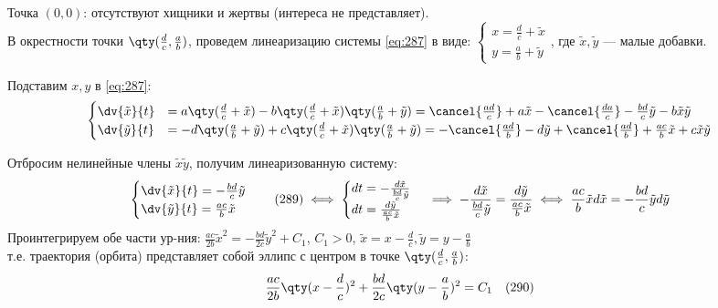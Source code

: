 Точка $(0,0)$: отсутствуют хищники и жертвы (интереса не представляет). \\
В окрестности точки $\qty(\frac{d}{c}, \frac{a}{b})$, проведем линеаризацию системы \eqref{eq:287} в виде:
$\begin{cases} x = \frac{d}{c} + \tilde{x} \\ y = \frac{a}{b} + \tilde{y} \end{cases}$, где $\tilde{x}, \tilde{y}$ — малые добавки.

Подставим $x,y$ в \eqref{eq:287}:
\begin{align*}
	\begin{cases}
		\dv{\tilde{x}}{t} &= a\qty(\frac{d}{c} + \tilde{x}) - b\qty(\frac{d}{c} + \tilde{x})\qty(\frac{a}{b} + \tilde{y}) = \cancel{\frac{ad}{c}} + a\tilde{x} - \cancel{\frac{da}{c}} - \frac{bd}{c}\tilde{y} - b\tilde{x}\tilde{y} \\
		\dv{\tilde{y}}{t} &= -d\qty(\frac{a}{b} + \tilde{y}) + c\qty(\frac{d}{c} + \tilde{x})\qty(\frac{a}{b} + \tilde{y}) = -\cancel{\frac{ad}{b}} - d\tilde{y} + \cancel{\frac{ad}{b}} + \frac{ac}{b}\tilde{x} + c\tilde{x}\tilde{y}
	\end{cases}
\end{align*}

Отбросим нелинейные члены $\tilde{x}\tilde{y}$, получим линеаризованную систему:
\begin{equation} \label{eq:289}
	\begin{cases}
		\dv{\tilde{x}}{t} = -\frac{bd}{c}\tilde{y} \\
		\dv{\tilde{y}}{t} = \frac{ac}{b}\tilde{x}
	\end{cases} \quad (289) \iff
	\begin{cases}
		dt = -\frac{d\tilde{x}}{\frac{bd}{c}\tilde{y}} \\
		dt = \frac{d\tilde{y}}{\frac{ac}{b}\tilde{x}}
	\end{cases} \implies
	-\frac{d\tilde{x}}{\frac{bd}{c}\tilde{y}} = \frac{d\tilde{y}}{\frac{ac}{b}\tilde{x}} \iff
	\frac{ac}{b}\tilde{x} d\tilde{x} = -\frac{bd}{c}\tilde{y} d\tilde{y}
\end{equation}
Проинтегрируем обе части ур-ния: $\frac{ac}{2b}\tilde{x}^2 = -\frac{bd}{2c}\tilde{y}^2 + C_1$, $C_1 > 0$, $\tilde{x} = x - \frac{d}{c}, \tilde{y} = y - \frac{a}{b}$ \\
т.е. траектория (орбита) представляет собой эллипс с центром в точке $\qty(\frac{d}{c}, \frac{a}{b})$:
\begin{equation} \label{eq:290}
	\frac{ac}{2b}\qty(x - \frac{d}{c})^2 + \frac{bd}{2c}\qty(y - \frac{a}{b})^2 = C_1 \quad (290)
\end{equation}

